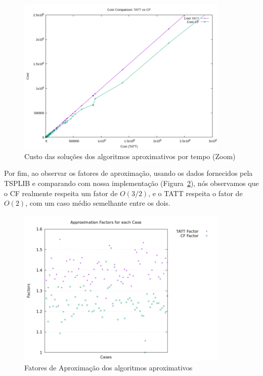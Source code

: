 \documentclass[12pt]{article}
\begin{document}
\begin{figure}
\centering
\includegraphics[width=0.9\textwidth]{tsplib_plot_costs_zoom.png}
\caption{Custo das soluções dos algoritmos aproximativos por tempo (Zoom)}
\label{fig:tsplibCostsZoom}
\end{figure}

Por fim, ao observar os fatores de aproximação, usando os dados fornecidos pela
TSPLIB e comparando com nossa implementação (Figura~\ref{fig:tspApproxFactors}),
nós observamos que o CF realmente respeita um fator de $O(3/2)$, e o TATT respeita
o fator de $O(2)$, com um caso médio semelhante entre os dois.

\begin{figure}
\centering
\includegraphics[width=0.9\textwidth]{factors.png}
\caption{Fatores de Aproximação dos algoritmos aproximativos}
\label{fig:tspApproxFactors}
\end{figure}
\end{document}
